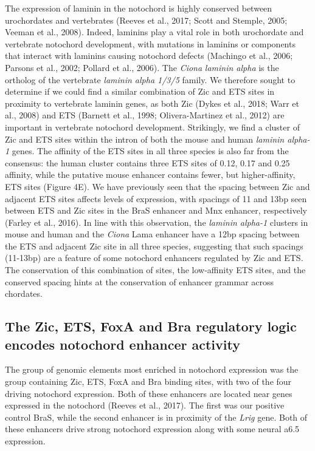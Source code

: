 The expression of laminin in the notochord is highly conserved between urochordates and vertebrates (Reeves et al., 2017; Scott and Stemple, 2005; Veeman et al., 2008). Indeed, laminins play a vital role in both urochordate and vertebrate notochord development, with mutations in laminins or components that interact with laminins causing notochord defects (Machingo et al., 2006; Parsons et al., 2002; Pollard et al., 2006). The \textit{Ciona} \textit{laminin alpha} is the ortholog of the vertebrate \textit{laminin alpha 1/3/5} family. We therefore sought to determine if we could find a similar combination of Zic and ETS sites in proximity to vertebrate laminin genes, as both Zic (Dykes et al., 2018; Warr et al., 2008) and ETS (Barnett et al., 1998; Olivera-Martinez et al., 2012) are important in vertebrate notochord development. Strikingly, we find a cluster of Zic and ETS sites within the intron of both the mouse and human \textit{laminin alpha-1} genes. The affinity of the ETS sites in all three species is also far from the consensus: the human cluster contains three ETS sites of 0.12, 0.17 and 0.25 affinity, while the putative mouse enhancer contains fewer, but higher-affinity, ETS sites (Figure 4E). We have previously seen that the spacing between Zic and adjacent ETS sites affects levels of expression, with spacings of 11 and 13bp seen between ETS and Zic sites in the BraS enhancer and Mnx enhancer, respectively (Farley et al., 2016). In line with this observation, the \textit{laminin alpha-1} clusters in mouse and human and the \textit{Ciona} Lama enhancer have a 12bp spacing between the ETS and adjacent Zic site in all three species, suggesting that such spacings (11-13bp) are a feature of some notochord enhancers regulated by Zic and ETS. The conservation of this combination of sites, the low-affinity ETS sites, and the conserved spacing hints at the conservation of enhancer grammar across chordates.

\subsection{The Zic, ETS, FoxA and Bra regulatory logic encodes notochord enhancer activity}

The group of genomic elements most enriched in notochord expression was the group containing Zic, ETS, FoxA and Bra binding sites, with two of the four driving notochord expression. Both of these enhancers are located near genes expressed in the notochord (Reeves et al., 2017). The first was our positive control BraS, while the second enhancer is in proximity of the \textit{Lrig} gene. Both of these enhancers drive strong notochord expression along with some neural a6.5 expression. 

